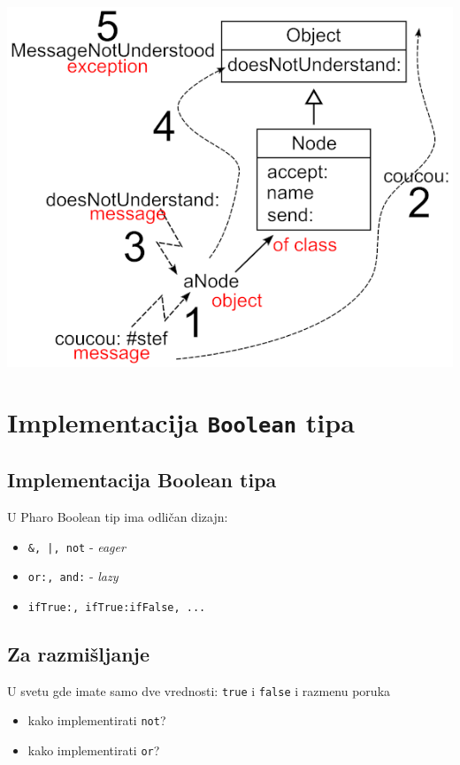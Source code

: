 \documentclass[presentation]{beamer}
\begin{document}
\begin{center}
\includegraphics[width=.9\linewidth]{./slike/doesNotUnderstand.png}
\end{center}

\section{Implementacija \texttt{Boolean} tipa}
\label{sec:org5a1882f}
\subsection{Implementacija Boolean tipa}
\label{sec:orgb857ee0}

U Pharo Boolean tip ima odličan dizajn:

\begin{itemize}
\item \texttt{\&, |, not} - \emph{eager}
\item \texttt{or:, and:} - \emph{lazy}
\item \texttt{ifTrue:, ifTrue:ifFalse, ...}
\end{itemize}

\subsection{Za razmišljanje}
\label{sec:org7b915a4}

U svetu gde imate samo dve vrednosti: \texttt{true} i \texttt{false} i razmenu poruka

\begin{itemize}
\item kako implementirati \texttt{not}?
\item kako implementirati \texttt{or}?
\end{itemize}
\end{document}
